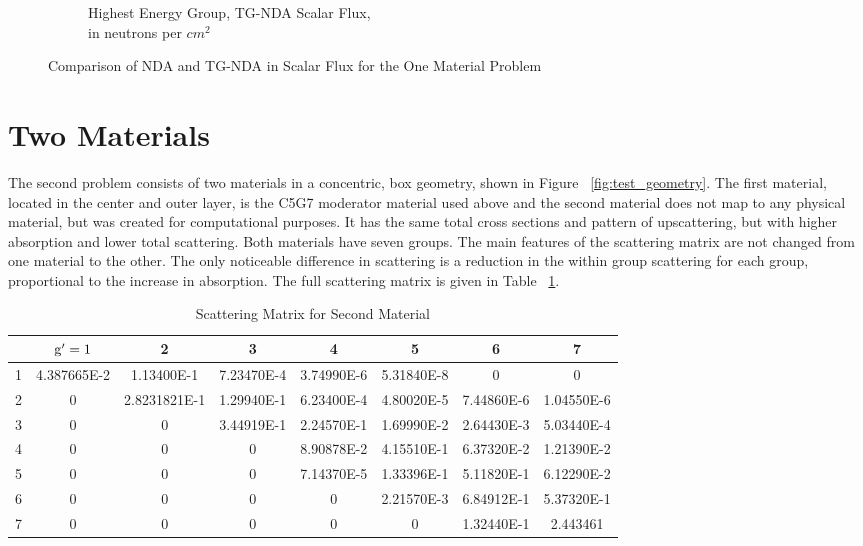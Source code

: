 \begin{figure}[H]
\begin{subfigure}{.5\textwidth}
  \caption{Highest Energy Group, TG-NDA Scalar Flux, \\ in neutrons per $cm^2$}
  \label{fig:TG-NDA-Mod}
\end{subfigure}
\caption{Comparison of NDA and TG-NDA in Scalar Flux for the One Material Problem}
\label{fig:Moderator}
\end{figure}

\section{Two Materials}
The second problem consists of two materials in a concentric, box geometry, shown in Figure ~\ref{fig:test_geometry}. 
The first material, located in the center and outer layer, is the C5G7 moderator material used above and the second material does not map to any physical material, but was created for computational purposes. It has the same total cross sections and pattern of upscattering, but with higher absorption and lower total scattering. Both materials have seven groups. The main features of the scattering matrix are not changed from one material to the other. The only noticeable difference in scattering is a reduction in the within group scattering for each group, proportional to the increase in absorption. The full scattering matrix is given in Table ~\ref{table:mat2}.

 \begin{table}[!htb]
\footnotesize
\centering
\caption{Scattering Matrix for Second Material}
\begin{center}
    \begin{tabular}{|c|c|c|c|c|c|c|c|}
\hline
 & $\mathrm{g}'=1$ & 2 & 3 & 4 & 5 & 6 & 7 \\ 
\hline
1 & 4.387665E-2 & 1.13400E-1   &  7.23470E-4 & 3.74990E-6 & 5.31840E-8  &     0    &     0    \\
\hline
2 & 0        &    2.8231821E-1  & 1.29940E-1 & 6.23400E-4 & 4.80020E-5 & 7.44860E-6 & 1.04550E-6 \\
\hline
3 & 0       &        0    &       3.44919E-1 & 2.24570E-1 & 1.69990E-2 & 2.64430E-3 & 5.03440E-4 \\
\hline
4 & 0         &      0      &         0     &  8.90878E-2 & 4.15510E-1 & 6.37320E-2 & 1.21390E-2 \\
\hline
5 & 0     &          0       &        0   &    7.14370E-5 & 1.33396E-1 & 5.11820E-1 & 6.12290E-2 \\
\hline
6 & 0   &        0      &         0   &        0     &  2.21570E-3 & 6.84912E-1 & 5.37320E-1 \\
\hline
7 & 0      &         0        &       0    &       0    &       0    &   1.32440E-1 & 2.443461  \\
\hline
    \end{tabular}
\end{center}
\label{table:mat2}
\end{table}

